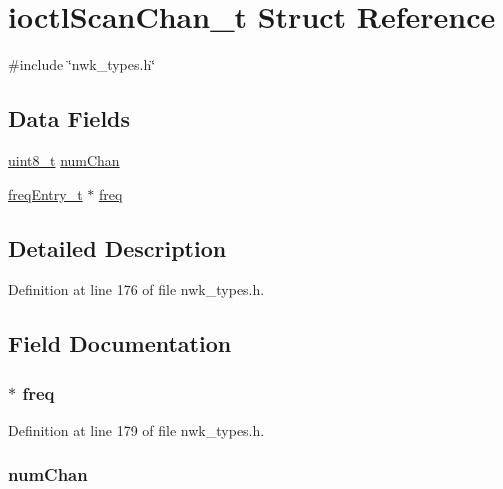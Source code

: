 \hypertarget{structioctlScanChan__t}{\section{ioctl\-Scan\-Chan\-\_\-t \-Struct \-Reference}
\label{structioctlScanChan__t}
}


{\ttfamily \#include \char`\"{}nwk\-\_\-types.\-h\char`\"{}}

\subsection*{\-Data \-Fields}
\begin{DoxyCompactItemize}
\item 
\hyperlink{bsp__msp430__defs_8h_aba7bc1797add20fe3efdf37ced1182c5}{uint8\-\_\-t} \hyperlink{structioctlScanChan__t_a44e556259f16f30607b7ca7dc8fc7ab9}{num\-Chan}
\item 
\hyperlink{structfreqEntry__t}{freq\-Entry\-\_\-t} $\ast$ \hyperlink{structioctlScanChan__t_af4f77f0a95a9ef3f8d76c23fcc8b9198}{freq}
\end{DoxyCompactItemize}


\subsection{\-Detailed \-Description}


\-Definition at line 176 of file nwk\-\_\-types.\-h.



\subsection{\-Field \-Documentation}
\hypertarget{structioctlScanChan__t_af4f77f0a95a9ef3f8d76c23fcc8b9198}{
\subsubsection[{freq}]{$\ast$ {\bf freq}}}\label{structioctlScanChan__t_af4f77f0a95a9ef3f8d76c23fcc8b9198}


\-Definition at line 179 of file nwk\-\_\-types.\-h.

\hypertarget{structioctlScanChan__t_a44e556259f16f30607b7ca7dc8fc7ab9}{
\subsubsection[{num\-Chan}]{ {\bf num\-Chan}}}\label{structioctlScanChan__t_a44e556259f16f30607b7ca7dc8fc7ab9}



